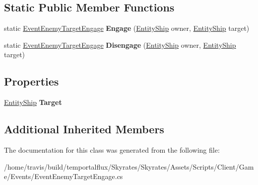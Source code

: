 \subsection*{Static Public Member Functions}
\begin{DoxyCompactItemize}
\item 
\hypertarget{class_skyrates_1_1_client_1_1_game_1_1_event_1_1_event_enemy_target_engage_a2c9a3d7e5291e50292dd3d668b1e3ed8}{static \hyperlink{class_skyrates_1_1_client_1_1_game_1_1_event_1_1_event_enemy_target_engage}{Event\-Enemy\-Target\-Engage} {\bfseries Engage} (\hyperlink{class_skyrates_1_1_client_1_1_entity_1_1_entity_ship}{Entity\-Ship} owner, \hyperlink{class_skyrates_1_1_client_1_1_entity_1_1_entity_ship}{Entity\-Ship} target)}\label{class_skyrates_1_1_client_1_1_game_1_1_event_1_1_event_enemy_target_engage_a2c9a3d7e5291e50292dd3d668b1e3ed8}

\item 
\hypertarget{class_skyrates_1_1_client_1_1_game_1_1_event_1_1_event_enemy_target_engage_a6dc1bc49d58f7857a5ff22b3bc985a0b}{static \hyperlink{class_skyrates_1_1_client_1_1_game_1_1_event_1_1_event_enemy_target_engage}{Event\-Enemy\-Target\-Engage} {\bfseries Disengage} (\hyperlink{class_skyrates_1_1_client_1_1_entity_1_1_entity_ship}{Entity\-Ship} owner, \hyperlink{class_skyrates_1_1_client_1_1_entity_1_1_entity_ship}{Entity\-Ship} target)}\label{class_skyrates_1_1_client_1_1_game_1_1_event_1_1_event_enemy_target_engage_a6dc1bc49d58f7857a5ff22b3bc985a0b}

\end{DoxyCompactItemize}
\subsection*{Properties}
\begin{DoxyCompactItemize}
\item 
\hypertarget{class_skyrates_1_1_client_1_1_game_1_1_event_1_1_event_enemy_target_engage_aaf28e68334f06b5627cf0687f4314332}{\hyperlink{class_skyrates_1_1_client_1_1_entity_1_1_entity_ship}{Entity\-Ship} {\bfseries Target}}\label{class_skyrates_1_1_client_1_1_game_1_1_event_1_1_event_enemy_target_engage_aaf28e68334f06b5627cf0687f4314332}

\end{DoxyCompactItemize}
\subsection*{Additional Inherited Members}


The documentation for this class was generated from the following file\-:\begin{DoxyCompactItemize}
\item 
/home/travis/build/temportalflux/\-Skyrates/\-Skyrates/\-Assets/\-Scripts/\-Client/\-Game/\-Events/Event\-Enemy\-Target\-Engage.\-cs\end{DoxyCompactItemize}
